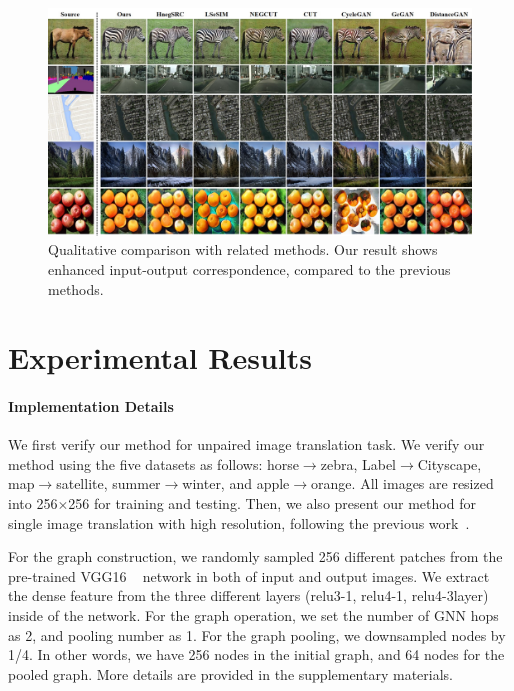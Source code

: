 \documentclass[letterpaper]{article} %
\begin{document}
\begin{figure}[!t]
\centering
\includegraphics[width=0.97\linewidth]{figs/result_aaai_2.jpg}
\caption{Qualitative comparison with related methods. Our result shows enhanced input-output correspondence, compared to the previous methods.}
\label{fig:result1}
\end{figure}




\section{Experimental Results}



\paragraph{Implementation Details}
We first verify our method for unpaired image translation task.
We verify our method using the five datasets as follows: horse$\rightarrow$zebra, Label$\rightarrow$Cityscape, map$\rightarrow$satellite, summer$\rightarrow$winter, and {apple$\rightarrow$orange}. All images are resized into 256$\times$256 for training and testing. Then, we also present our method for single image translation with high resolution, following the previous work~\cite{cut}.

For the graph construction, we randomly sampled 256 different patches from the pre-trained VGG16 ~\cite{vgg} network in both of input and output images. We extract the dense feature from the three different layers (relu3-1, relu4-1, relu4-3layer) inside of the network. For the graph operation, we set the number of GNN hops as 2, and pooling number as 1. For the graph pooling, we downsampled nodes by 1/4. In other words, we have 256 nodes in the initial graph, and 64 nodes for the pooled graph.
More details are provided in the supplementary materials.
\end{document}
